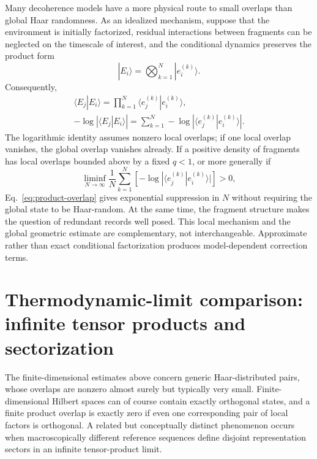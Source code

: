 \documentclass[aps,pra,reprint,superscriptaddress,nofootinbib,longbibliography]{revtex4-2}
\newcommand{\ket}[1]{| #1 \rangle}
\begin{document}
Many decoherence models have a more physical route to small overlaps than
global Haar randomness.  As an idealized mechanism, suppose that the
environment is initially factorized, residual interactions between fragments
can be neglected on the timescale of interest, and the conditional dynamics
preserves the product form
\begin{equation}
 \ket{E_i}=\bigotimes_{k=1}^{N}\ket{e_i^{(k)}}.
\end{equation}
Consequently,
\begin{equation}
\begin{split}
 \langle E_j|E_i\rangle
 =\prod_{k=1}^{N}\langle e_j^{(k)}|e_i^{(k)}\rangle,
 \\
 -\log|\langle E_j|E_i\rangle|
 =\sum_{k=1}^{N}-\log|\langle e_j^{(k)}|e_i^{(k)}\rangle|.
 \label{eq:product-overlap}
\end{split}
\end{equation}
The logarithmic identity assumes nonzero local overlaps; if one local overlap
vanishes, the global overlap vanishes already.
If a positive density of fragments has local overlaps bounded above by a
fixed $q<1$, or more generally if
\begin{equation}
 \liminf_{N\to\infty}\frac1N\sum_{k=1}^N
 \left[-\log|\langle e_j^{(k)}|e_i^{(k)}\rangle|\right]>0,
 \label{eq:positive-overlap-rate}
\end{equation}
Eq.~\eqref{eq:product-overlap} gives exponential suppression in $N$ without
requiring the global state to be Haar-random.  At the same time, the fragment
structure makes the question of redundant records well posed.
This local mechanism and the global geometric estimate are complementary,
not interchangeable.  Approximate rather than exact conditional
factorization produces model-dependent correction terms.

\section{Thermodynamic-limit comparison: infinite tensor products and sectorization}
\label{sec:infinite-tensor-products}

The finite-dimensional estimates above concern generic Haar-distributed
pairs, whose overlaps are nonzero almost surely but typically very small.
Finite-dimensional Hilbert spaces can of course contain exactly orthogonal
states, and a finite product overlap is exactly zero if even one corresponding
pair of local factors is orthogonal.  A related but conceptually distinct
phenomenon occurs when macroscopically different reference sequences define
disjoint representation sectors in an infinite tensor-product limit.
\end{document}
